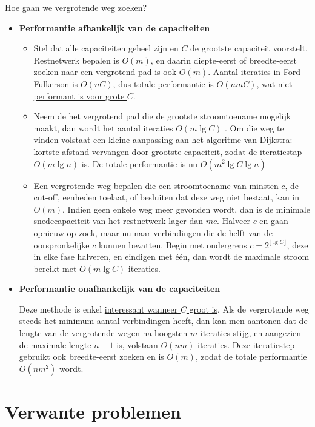 \documentclass{report}
\begin{document}
Hoe gaan we vergrotende weg zoeken? 
\begin{itemize}
	\item \textbf{Performantie afhankelijk van de capaciteiten}
		\begin{itemize}
			\item Stel dat alle capaciteiten geheel zijn en $C$ de grootste capaciteit voorstelt. Restnetwerk bepalen is $O(m)$, en daarin diepte-eerst of breedte-eerst zoeken naar een vergrotend pad is ook $O(m)$. Aantal iteraties in Ford-Fulkerson is $O(nC)$, dus totale performantie is $O(nmC)$, wat \underline{niet performant is voor grote $C$}.
			\item Neem de het vergrotend pad die de grootste stroomtoename mogelijk maakt, dan wordt het aantal iteraties $O(m\lg C)$ . Om die weg te vinden volstaat een kleine aanpassing aan het algoritme van Dijkstra: kortste afstand vervangen door grootste capaciteit, zodat de iteratiestap $O(m \lg n)$  is. De totale performantie is nu $O(m^2 \lg C \lg n)$
			\item Een vergrotende weg bepalen die een stroomtoename van minsten $c$, de cut-off, eenheden toelaat, of besluiten dat deze weg niet bestaat, kan in $O(m)$. Indien geen enkele weg meer gevonden wordt, dan is de minimale snedecapaciteit van het restnetwerk lager dan $mc$. Halveer $c$ en gaan opnieuw op zoek, maar nu naar verbindingen die de helft van de oorspronkelijke $c$ kunnen bevatten. Begin met ondergrens $c = 2^{\lfloor \lg C \rfloor}$, deze in elke fase halveren, en eindigen met één, dan wordt de maximale stroom bereikt met $O(m \lg C)$ iteraties.
		\end{itemize}
	\item \textbf{Performantie onafhankelijk van de capaciteiten}

		Deze methode is enkel \underline{interessant wanneer $C$ groot is}. Als de vergrotende weg steeds het minimum aantal verbindingen heeft, dan kan men aantonen  dat de lengte van de vergrotende wegen na hoogsten $m$ iteraties stijg, en aangezien de maximale lengte $n - 1$ is, volstaan $O(nm)$ iteraties. Deze iteratiestep gebruikt ook breedte-eerst zoeken en is $O(m)$, zodat de totale performantie $O(nm^2)$ wordt.
\end{itemize}
\section{Verwante problemen}
\end{document}
